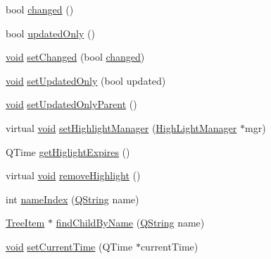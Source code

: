 \begin{DoxyCompactItemize}
\item 
bool \hyperlink{group___u_a_v_object_browser_plugin_ga092f37d4eb04a9889985eadb5066ff6e}{changed} ()
\item 
bool \hyperlink{group___u_a_v_object_browser_plugin_gae407428df05b1f28bcb6e8bf2cd86b73}{updated\-Only} ()
\item 
\hyperlink{group___u_a_v_objects_plugin_ga444cf2ff3f0ecbe028adce838d373f5c}{void} \hyperlink{group___u_a_v_object_browser_plugin_ga2562126b279261daaf87d6234bfb807c}{set\-Changed} (bool \hyperlink{group___u_a_v_object_browser_plugin_ga092f37d4eb04a9889985eadb5066ff6e}{changed})
\item 
\hyperlink{group___u_a_v_objects_plugin_ga444cf2ff3f0ecbe028adce838d373f5c}{void} \hyperlink{group___u_a_v_object_browser_plugin_ga63e16f896af89aa165dcd9c31d42ce83}{set\-Updated\-Only} (bool updated)
\item 
\hyperlink{group___u_a_v_objects_plugin_ga444cf2ff3f0ecbe028adce838d373f5c}{void} \hyperlink{group___u_a_v_object_browser_plugin_gae74eb4785ae705b5a9ffc056a71fb88a}{set\-Updated\-Only\-Parent} ()
\item 
virtual \hyperlink{group___u_a_v_objects_plugin_ga444cf2ff3f0ecbe028adce838d373f5c}{void} \hyperlink{group___u_a_v_object_browser_plugin_gac523fe360648e1e148c4b30f6918c6be}{set\-Highlight\-Manager} (\hyperlink{class_high_light_manager}{\-High\-Light\-Manager} $\ast$mgr)
\item 
\-Q\-Time \hyperlink{group___u_a_v_object_browser_plugin_gabc3b5a703ec23600e388018db3349369}{get\-Higlight\-Expires} ()
\item 
virtual \hyperlink{group___u_a_v_objects_plugin_ga444cf2ff3f0ecbe028adce838d373f5c}{void} \hyperlink{group___u_a_v_object_browser_plugin_ga9620f3abc5fda75861a24032594766a6}{remove\-Highlight} ()
\item 
int \hyperlink{group___u_a_v_object_browser_plugin_gac2b731cbaed396ea1819b12ddb0f7767}{name\-Index} (\hyperlink{group___u_a_v_objects_plugin_gab9d252f49c333c94a72f97ce3105a32d}{\-Q\-String} name)
\item 
\hyperlink{class_tree_item}{\-Tree\-Item} $\ast$ \hyperlink{group___u_a_v_object_browser_plugin_ga17e124da1542c7dab530add7dce6d170}{find\-Child\-By\-Name} (\hyperlink{group___u_a_v_objects_plugin_gab9d252f49c333c94a72f97ce3105a32d}{\-Q\-String} name)
\item 
\hyperlink{group___u_a_v_objects_plugin_ga444cf2ff3f0ecbe028adce838d373f5c}{void} \hyperlink{group___u_a_v_object_browser_plugin_ga2d8b58f0944b4a2b934f1aacc5188f17}{set\-Current\-Time} (\-Q\-Time $\ast$current\-Time)
\end{DoxyCompactItemize}
